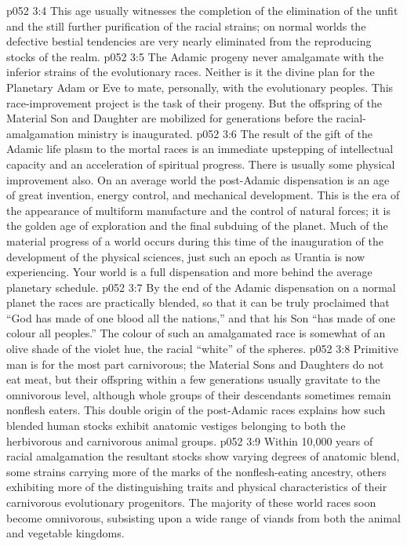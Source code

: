 \vs p052 3:4 \pc This age usually witnesses the completion of the elimination of the unfit and the still further purification of the racial strains; on normal worlds the defective bestial tendencies are very nearly eliminated from the reproducing stocks of the realm.
\vs p052 3:5 The Adamic progeny never amalgamate with the inferior strains of the evolutionary races. Neither is it the divine plan for the Planetary Adam or Eve to mate, personally, with the evolutionary peoples. This race\hyp{}improvement project is the task of their progeny. But the offspring of the Material Son and Daughter are mobilized for generations before the racial\hyp{}amalgamation ministry is inaugurated.
\vs p052 3:6 The result of the gift of the Adamic life plasm to the mortal races is an immediate upstepping of intellectual capacity and an acceleration of spiritual progress. There is usually some physical improvement also. On an average world the post\hyp{}Adamic dispensation is an age of great invention, energy control, and mechanical development. This is the era of the appearance of multiform manufacture and the control of natural forces; it is the golden age of exploration and the final subduing of the planet. Much of the material progress of a world occurs during this time of the inauguration of the development of the physical sciences, just such an epoch as Urantia is now experiencing. Your world is a full dispensation and more behind the average planetary schedule.
\vs p052 3:7 By the end of the Adamic dispensation on a normal planet the races are practically blended, so that it can be truly proclaimed that “God has made of one blood all the nations,” and that his Son “has made of one colour all peoples.” The colour of such an amalgamated race is somewhat of an olive shade of the violet hue, the racial “white” of the spheres.
\vs p052 3:8 \pc Primitive man is for the most part carnivorous; the Material Sons and Daughters do not eat meat, but their offspring within a few generations usually gravitate to the omnivorous level, although whole groups of their descendants sometimes remain nonflesh eaters. This double origin of the post\hyp{}Adamic races explains how such blended human stocks exhibit anatomic vestiges belonging to both the herbivorous and carnivorous animal groups.
\vs p052 3:9 Within 10,000 years of racial amalgamation the resultant stocks show varying degrees of anatomic blend, some strains carrying more of the marks of the nonflesh\hyp{}eating ancestry, others exhibiting more of the distinguishing traits and physical characteristics of their carnivorous evolutionary progenitors. The majority of these world races soon become omnivorous, subsisting upon a wide range of viands from both the animal and vegetable kingdoms.
